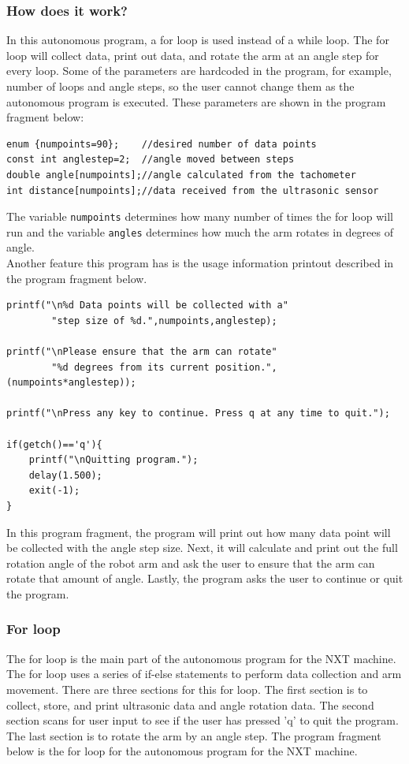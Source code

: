 \documentclass[11pt]{article}
\begin{document}
\subsubsection*{How does it work?}
In this autonomous program, a for loop is used instead of a while loop.
The for loop will collect data, print out data, and rotate the arm at an angle step for every
loop. Some of the parameters are hardcoded in the program, for example, number of loops and angle steps,
so the user cannot change them as the autonomous program is executed. These parameters are shown in the program fragment below:

\begin{verbatim}
enum {numpoints=90};    //desired number of data points
const int anglestep=2;	//angle moved between steps
double angle[numpoints];//angle calculated from the tachometer
int distance[numpoints];//data received from the ultrasonic sensor
\end{verbatim}

The variable \verb+numpoints+ determines how many number of times the for loop will run and
the variable \verb+angles+ determines how much the arm rotates in degrees of angle.\\
Another feature this program has is the usage information printout described in the program fragment below.
\begin{verbatim}
printf("\n%d Data points will be collected with a"
        "step size of %d.",numpoints,anglestep);

printf("\nPlease ensure that the arm can rotate"
        "%d degrees from its current position.",(numpoints*anglestep));

printf("\nPress any key to continue. Press q at any time to quit.");

if(getch()=='q'){
    printf("\nQuitting program.");
    delay(1.500);
    exit(-1);
}
\end{verbatim}

In this program fragment, the program will print out how many data point will be collected
with the angle step size. Next, it will calculate and print out the full rotation angle of 
the robot arm and ask the user to ensure that the arm can rotate that amount of angle.
Lastly, the program asks the user to continue or quit the program.

\subsubsection*{For loop}
The for loop is the main part of the autonomous program for the NXT machine.
The for loop uses a series of if-else statements to perform data collection and arm movement.
There are three sections for this for loop. The first section is to collect, store, and print 
ultrasonic data and angle rotation data. The second section scans for user input to see if the 
user has pressed 'q' to quit the program. The last section is to rotate the arm by an angle step.
The program fragment below is the for loop for the autonomous program for the NXT machine.
\end{document}
